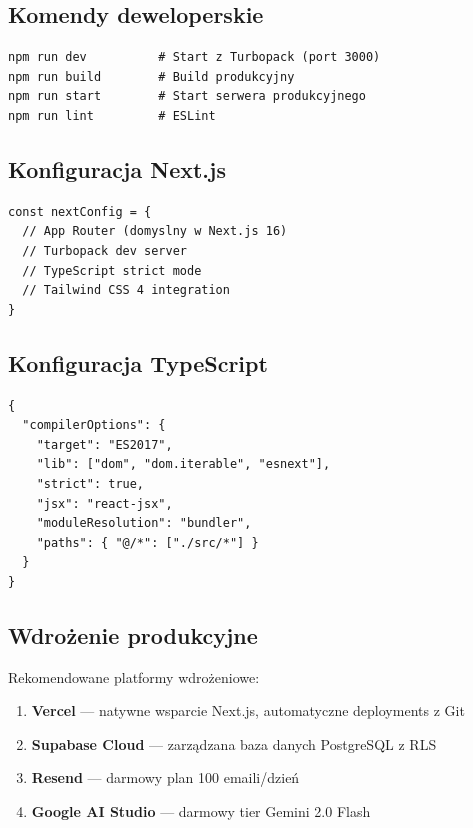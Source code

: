 \documentclass[12pt,a4paper]{article}
\begin{document}
\subsection{Komendy deweloperskie}

\begin{lstlisting}[style=typescript, title=Komendy package.json]
npm run dev          # Start z Turbopack (port 3000)
npm run build        # Build produkcyjny
npm run start        # Start serwera produkcyjnego
npm run lint         # ESLint
\end{lstlisting}

\subsection{Konfiguracja Next.js}

\begin{lstlisting}[style=typescript, title=next.config.ts]
const nextConfig = {
  // App Router (domyslny w Next.js 16)
  // Turbopack dev server
  // TypeScript strict mode
  // Tailwind CSS 4 integration
}
\end{lstlisting}

\subsection{Konfiguracja TypeScript}

\begin{lstlisting}[style=typescript, title=tsconfig.json (kluczowe opcje)]
{
  "compilerOptions": {
    "target": "ES2017",
    "lib": ["dom", "dom.iterable", "esnext"],
    "strict": true,
    "jsx": "react-jsx",
    "moduleResolution": "bundler",
    "paths": { "@/*": ["./src/*"] }
  }
}
\end{lstlisting}

\subsection{Wdrożenie produkcyjne}

Rekomendowane platformy wdrożeniowe:

\begin{enumerate}[leftmargin=2em]
  \item \textbf{Vercel} — natywne wsparcie Next.js, automatyczne deployments z Git
  \item \textbf{Supabase Cloud} — zarządzana baza danych PostgreSQL z RLS
  \item \textbf{Resend} — darmowy plan 100 emaili/dzień
  \item \textbf{Google AI Studio} — darmowy tier Gemini 2.0 Flash
\end{enumerate}
\end{document}
